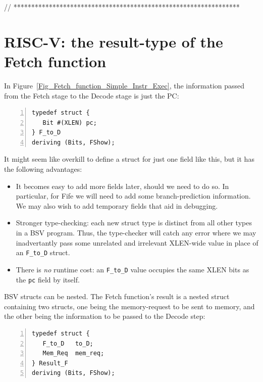 // ****************************************************************

\section{RISC-V: the result-type of the Fetch function}

In Figure~\ref{Fig_Fetch_function_Simple_Instr_Exec}, the information
passed from the Fetch stage to the Decode stage is just the PC:

\begin{Verbatim}[frame=single, numbers=left]
typedef struct {
   Bit #(XLEN) pc;
} F_to_D
deriving (Bits, FShow);
\end{Verbatim}


It might seem like overkill to define a struct for just one field like
this, but it has the following advantages:

\begin{itemize}

  \item It becomes easy to add more fields later, should we need to do
    so.  In particular, for Fife we will need to add some
    branch-prediction information.  We may also wish to add temporary
    fields that aid in debugging.

  \item Stronger type-checking: each new struct type is distinct from
    all other types in a BSV program.  Thus, the type-checker will
    catch any error where we may inadvertantly pass some unrelated and
    irrelevant XLEN-wide value in place of an \verb|F_to_D| struct.

  \item There is \emph{no} runtime cost: an \verb|F_to_D| value
    occupies the same XLEN bits as the \verb|pc| field by itself.

\end{itemize}


BSV structs can be nested.  The Fetch function's result is a nested
struct containing two structs, one being the memory-request to be sent
to memory, and the other being the information to be passed to the
Decode step:

\begin{Verbatim}[frame=single, numbers=left]
typedef struct {
   F_to_D   to_D;
   Mem_Req  mem_req;
} Result_F
deriving (Bits, FShow);
\end{Verbatim}

